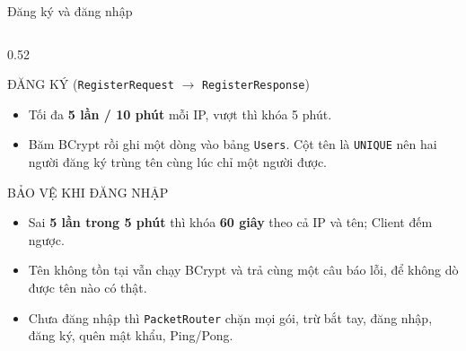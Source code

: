 \documentclass[aspectratio=169,9pt]{beamer}
\newenvironment{haicot}[1]{\begin{columns}[T,onlytextwidth]\begin{column}{#1\textwidth}}{\end{column}\end{columns}}
\begin{document}
\begin{frame}[t,label=auth]{Đăng ký và đăng nhập}
\begin{haicot}{0.52}
\begin{khung}{ĐĂNG KÝ (\texttt{RegisterRequest} $\rightarrow$ \texttt{RegisterResponse})}
\begin{itemize}
        \item Tối đa \textbf{5 lần / 10 phút} mỗi IP, vượt thì khóa 5 phút.
        \item Băm BCrypt rồi ghi một dòng vào bảng \texttt{Users}. Cột tên là \texttt{UNIQUE} nên hai người đăng ký trùng tên cùng lúc chỉ một người được.
      \end{itemize}
    \end{khung}
    \begin{khung}{BẢO VỆ KHI ĐĂNG NHẬP}
      \begin{itemize}\setlength{\itemsep}{1pt}
        \item Sai \textbf{5 lần trong 5 phút} thì khóa \textbf{60 giây} theo cả IP và tên; Client đếm ngược.
        \item Tên không tồn tại vẫn chạy BCrypt và trả cùng một câu báo lỗi, để không dò được tên nào có thật.
        \item Chưa đăng nhập thì \texttt{PacketRouter} chặn mọi gói, trừ bắt tay, đăng nhập, đăng ký, quên mật khẩu, Ping/Pong.
      \end{itemize}
    \end{khung}
  \end{haicot}
\end{frame}
\end{document}

